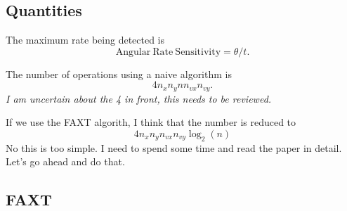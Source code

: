 \documentclass[10pt]{article}
\begin{document}
\subsection{Quantities}
	The maximum rate being detected is 
\begin{equation}
	\mathrm{Angular\ Rate\ Sensitivity} = \theta / t.
\end{equation}

The number of operations using a naive algorithm is 
\begin{equation}
	4 n_x n_y n n_{vx} n_{vy}.
\end{equation}
{\it I am uncertain about the 4 in front, this needs to be reviewed.}

If we use the FAXT algorith, I think that the number is reduced to
\begin{equation}
	4 n_x n_y n_{vx} n_{vy} \log_2{(n)}
\end{equation}
No this is too simple.  I need to spend some time and read the paper
in detail.  Let's go ahead and do that.

\subsection{FAXT}
\end{document}

